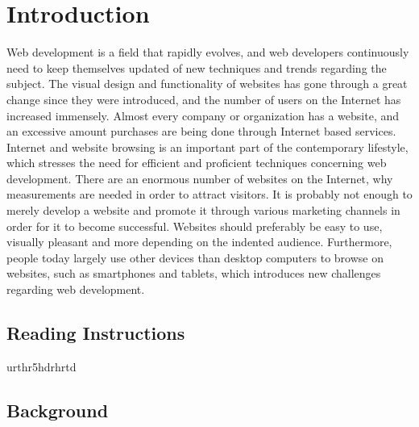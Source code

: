 \section{Introduction}

Web development is a field that rapidly evolves, and web developers continuously need to keep themselves updated of new techniques and trends regarding the subject. The visual design and functionality of websites has gone through a great change since they were introduced, and the number of users on the Internet has increased immensely. Almost every company or organization has a website, and an excessive amount purchases are being done through Internet based services. Internet and website browsing is an important part of the contemporary lifestyle, which stresses the need for efficient and proficient techniques concerning web development. 
There are an enormous number of websites on the Internet, why measurements are needed in order to attract visitors. It is probably not enough to merely develop a website and promote it through various marketing channels in order for it to become successful. Websites should preferably be easy to use, visually pleasant and more depending on the indented audience. Furthermore, people today largely use other devices than desktop computers to browse on websites, such as smartphones and tablets, which introduces new challenges regarding web development.


\subsection{Reading Instructions}

urthr5hdrhrtd

\subsection{Background}

